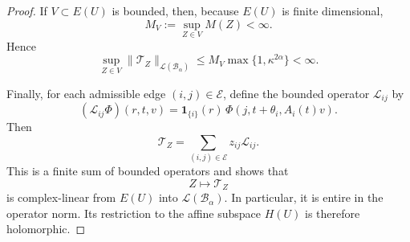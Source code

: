 \documentclass[11pt,a4paper]{amsart}
\newtheorem{remark}[theorem]{Remark}
\newcommand{\T}{\mathbb T}
\newcommand{\C}{\mathbb C}
\newcommand{\PP}{\mathbb P}
\newcommand{\cB}{\mathcal B}
\newcommand{\norm}[1]{\left\lVert #1\right\rVert}
\begin{document}
\begin{proof}
If \(V\subset E(U)\) is bounded, then, because \(E(U)\) is finite
dimensional,
\[
 M_V:=\sup_{Z\in V}M(Z)<\infty.
\]
Hence
\[
 \sup_{Z\in V}
 \|\mathcal T_Z\|_{\mathcal L(\mathcal B_\alpha)}
 \leq
 M_V\max\{1,\kappa^{2\alpha}\}<\infty.
\]

Finally, for each admissible edge \((i,j)\in\mathcal E\), define the
bounded operator \(\mathcal L_{ij}\) by
\[
 (\mathcal L_{ij}\Phi)(r,t, v)
 =
 \mathbf 1_{\{i\}}(r)\,
 \Phi\left(
 j,t+\theta_i,A_i(t)v \right).
\]
Then
\begin{equation}\label{eq:operator-linear-decomposition}
 \mathcal T_Z
 =
 \sum_{(i,j)\in\mathcal E}z_{ij}\mathcal L_{ij}.
\end{equation}
This is a finite sum of bounded operators and shows that
\[
 Z\longmapsto\mathcal T_Z
\]
is complex-linear from \(E(U)\) into
\(\mathcal L(\mathcal B_\alpha)\).  In particular, it is entire in
the operator norm.  Its restriction to the affine subspace \(H(U)\)
is therefore holomorphic.
\end{proof}








%
%
\end{document}
